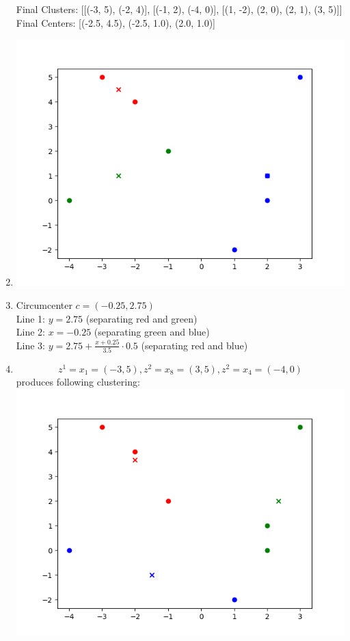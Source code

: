 \documentclass[12pt]{article}
\begin{document}
\begin{enumerate}[label=(\alph*)]
			Final Clusters: [[(-3, 5), (-2, 4)], [(-1, 2), (-4, 0)], [(1, -2), (2, 0), (2, 1), (3, 5)]] \\
			Final Centers: [(-2.5, 4.5), (-2.5, 1.0), (2.0, 1.0)]
	\item	\includegraphics{code/exercise_04_a.png}
	\item	Circumcenter $c = (-0.25, 2.75)$ \\
			Line 1: $y = 2.75$ (separating red and green) \\
			Line 2: $x = -0.25$ (separating green and blue) \\
			Line 3: $y = 2.75 + \frac{x+0.25}{3.5} \cdot 0.5$ (separating red and blue)
	\item	\[z^1=x_1=(-3,5), z^2=x_8=(3,5), z^2=x_4=(-4,0)\]
			produces following clustering: \\
			\includegraphics{code/exercise_04_d.png}

\end{enumerate}
\end{document}
